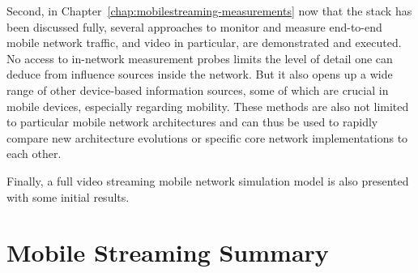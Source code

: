 Second, in Chapter~\ref{chap:mobilestreaming-measurements} now that the stack has been discussed fully, several approaches to monitor and measure end-to-end mobile network traffic, and video in particular, are demonstrated and executed. No access to in-network measurement probes limits the level of detail one can deduce from influence sources inside the network. But it also opens up a wide range of other device-based information sources, some of which are crucial in mobile devices, especially regarding mobility. These methods are also not limited to particular mobile network architectures and can thus be used to rapidly compare new architecture evolutions or specific core network implementations to each other. 

Finally, a full video streaming mobile network simulation model is also presented with some initial results.













\section{Mobile Streaming Summary}



